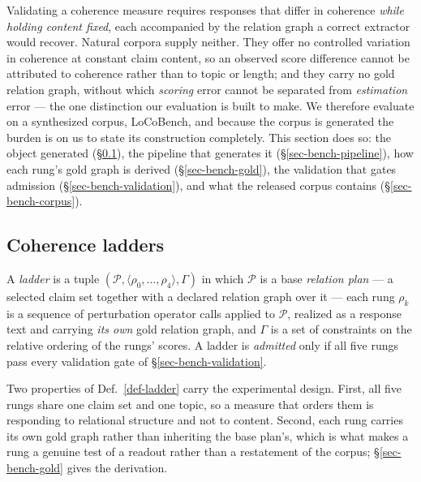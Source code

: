 Validating a coherence measure requires responses that differ in coherence \emph{while holding content
fixed}, each accompanied by the relation graph a correct extractor would recover. Natural corpora supply
neither. They offer no controlled variation in coherence at constant claim content, so an observed score
difference cannot be attributed to coherence rather than to topic or length; and they carry no gold
relation graph, without which \emph{scoring} error cannot be separated from \emph{estimation} error --- the
one distinction our evaluation is built to make. We therefore evaluate on a synthesized corpus,
LoCoBench, and because the corpus is generated the burden is on us to state its construction completely.
This section does so: the object generated (\S\ref{sec-bench-ladder}), the pipeline that generates it
(\S\ref{sec-bench-pipeline}), how each rung's gold graph is derived (\S\ref{sec-bench-gold}), the
validation that gates admission (\S\ref{sec-bench-validation}), and what the released corpus contains
(\S\ref{sec-bench-corpus}).

\subsection{Coherence ladders}
\label{sec-bench-ladder}

\begin{definition}
\label{def-ladder}
A \emph{ladder} is a tuple $(\mathcal{P},\langle\rho_0,\dots,\rho_4\rangle,\Gamma)$ in which
$\mathcal{P}$ is a base \emph{relation plan} --- a selected claim set together with a declared relation
graph over it --- each rung $\rho_k$ is a sequence of perturbation operator calls applied to
$\mathcal{P}$, realized as a response text and carrying \emph{its own} gold relation graph, and $\Gamma$
is a set of constraints on the relative ordering of the rungs' scores. A ladder is \emph{admitted} only
if all five rungs pass every validation gate of \S\ref{sec-bench-validation}.
\end{definition}

Two properties of Def.~\ref{def-ladder} carry the experimental design. First, all five rungs share one
claim set and one topic, so a measure that orders them is responding to relational structure and not to
content. Second, each rung carries its own gold graph rather than inheriting the base plan's, which is
what makes a rung a genuine test of a readout rather than a restatement of the corpus; \S\ref{sec-bench-gold}
gives the derivation.

